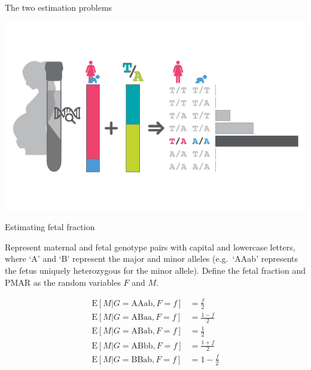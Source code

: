 \documentclass[
  10pt,
  ignorenonframetext,
  m]{beamer}
\begin{document}
\begin{frame}{The two estimation problems}
\protect\hypertarget{the-two-estimation-problems}{}

\includegraphics{images/cellFreeDiagram.pdf}

\end{frame}

\begin{frame}{Estimating fetal fraction}
\protect\hypertarget{estimating-fetal-fraction}{}

Represent maternal and fetal genotype pairs with capital and lowercase
letters, where `A' and `B' represent the major and minor alleles
(e.g.~`AAab' represents the fetus uniquely heterozygous for the minor
allele). Define the fetal fraction and PMAR as the random variables
\(F\) and \(M\).

\begin{align}
\text{E}[M \rvert G = \text{AAab}, F = f] &= \frac{f}{2} \\
\text{E}[M \rvert G = \text{ABaa}, F = f] &= \frac{1 - f}{2} \\
\text{E}[M \rvert G = \text{ABab}, F = f] &= \frac{1}{2} \\
\text{E}[M \rvert G = \text{ABbb}, F = f] &= \frac{1 + f}{2} \\
\text{E}[M \rvert G = \text{BBab}, F = f] &= 1 - \frac{f}{2} 
\end{align}

\end{frame}
\end{document}
